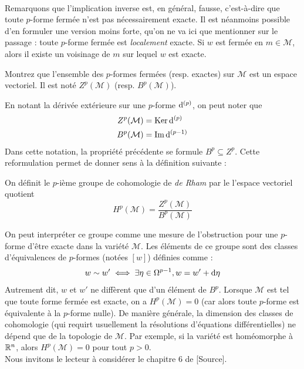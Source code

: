 \\
Remarquons que l'implication inverse est, en général, fausse, c'est-à-dire que toute $p$-forme fermée n'est pas nécessairement exacte. Il est néanmoins possible d'en formuler une version moins forte, qu'on ne va ici que mentionner sur le passage : toute $p$-forme fermée est \emph{localement} exacte. Si $w$ est fermée en $m\in\mathcal{M}$, alors il existe un voisinage de $m$ sur lequel $w$ est exacte.
\begin{exerc}
    Montrez que l'ensemble des $p$-formes fermées (resp. exactes) sur $\mathcal{M}$ est un espace vectoriel. Il est noté $Z^p(\mathcal{M})$ (resp. $B^p(\mathcal{M})$).
\end{exerc}
En notant la dérivée extérieure sur une $p$-forme $\mathrm{d}^{(p)}$, on peut noter que
\begin{align}
    Z^p(\mathcal{M}) &= \mathrm{Ker} \, \mathrm{d}^{(p)}\\
    B^p(\mathcal{M}) &= \mathrm{Im} \, \mathrm{d}^{(p-1)}
\end{align}
Dans cette notation, la propriété précédente se formule $B^p \subseteq Z^p$. Cette reformulation permet de donner sens à la définition suivante :
\begin{theoremframe}
    \begin{defi}
        On définit le $p$-ième groupe de cohomologie de \emph{de Rham} par le l'espace vectoriel quotient 
        \begin{equation}
            H^p(\mathcal{M}) = \frac{Z^p(\mathcal{M})}{B^p(\mathcal{M})}
        \end{equation}
    \end{defi}
\end{theoremframe}
On peut interpréter ce groupe comme une mesure de l'obstruction pour une $p$-forme d'être exacte dans la variété $\mathcal{M}$. Les éléments de ce groupe sont des classes d'équivalences de $p$-formes (notées $[w]$) définies comme :
\begin{equation}
    w \sim w' \iff \exists \eta \in \Omega^{p-1}, w = w' + \mathrm{d} \eta
\end{equation}
Autrement dit, $w$ et $w'$ ne diffèrent que d'un élément de $B^p$. Lorsque $\mathcal{M}$ est tel que toute forme fermée est exacte, on a $H^p(\mathcal{M})=0$ (car alors toute $p$-forme est équivalente à la $p$-forme nulle). De manière générale, la dimension des classes de cohomologie (qui requirt usuellement la résolutions d'équations différentielles) ne dépend que de la topologie de $\mathcal{M}$. Par exemple, si la variété est homéomorphe à $\mathbb{R}^n$, alors $H^p(\mathcal{M}) = 0$ pour tout $p>0$.\\
Nous invitons le lecteur à considérer le chapitre 6 de [Source].

